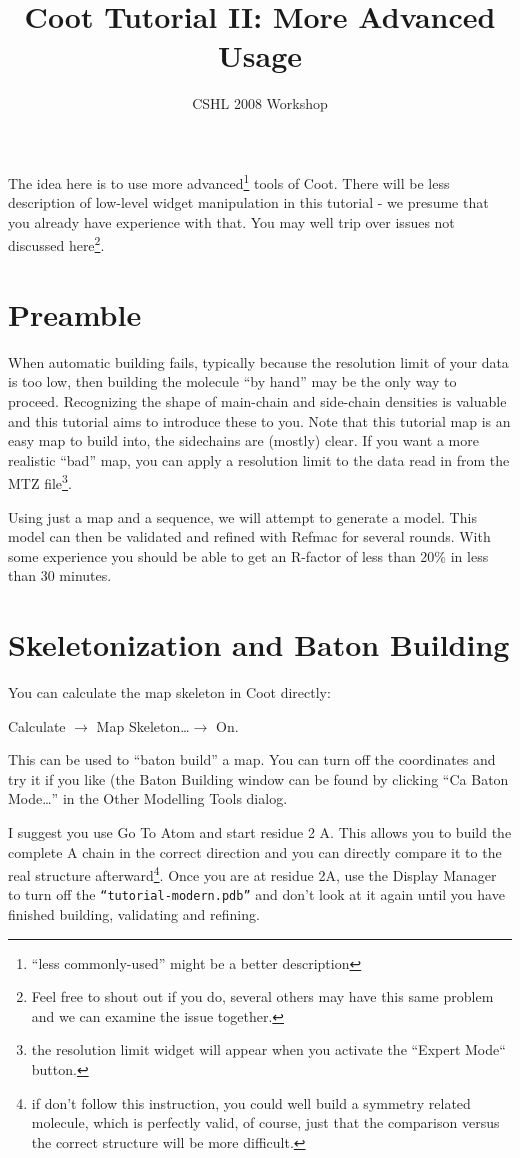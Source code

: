 \documentclass{article}
\title{Coot Tutorial II: More Advanced Usage}
\author{CSHL 2008 Workshop}
\begin{document}
\maketitle

The idea here is to use more advanced\footnote{``less commonly-used''
  might be a better description} tools of Coot.  There will be less
description of low-level widget manipulation in this tutorial - we
presume that you already have experience with that.  You may well trip
over issues not discussed here\footnote{Feel free to shout out if you
  do, several others may have this same problem and we can examine the
  issue together.}.

\section{Preamble}

When automatic building fails, typically because the resolution limit
of your data is too low, then building the molecule ``by hand'' may be
the only way to proceed.  Recognizing the shape of main-chain and
side-chain densities is valuable and this tutorial aims to introduce
these to you.  Note that this tutorial map is an easy map to build
into, the sidechains are (mostly) clear.  If you want a more realistic
``bad'' map, you can apply a resolution limit to the data read in from
the MTZ file\footnote{the resolution limit widget will appear when you
  activate the ``Expert Mode`` button.}.

Using just a map and a sequence, we will attempt to generate a model.
This model can then be validated and refined with Refmac for several
rounds.  With some experience you should be able to get an R-factor of
less than 20\% in less than 30 minutes.

\section{Skeletonization and Baton Building}


You can calculate the map skeleton in Coot directly:

\textsf{Calculate $\rightarrow$ Map Skeleton\ldots $\rightarrow$ On.}

This can be used to ``baton build'' a map.  You can turn off the
coordinates and try it if you like (the Baton Building window can be
found by clicking \textsf{``Ca Baton Mode\ldots''} in the Other
Modelling Tools dialog.
  
I suggest you use Go To Atom and start residue 2 A. This allows you to
build the complete A chain in the correct direction and you can
directly compare it to the real structure afterward\footnote{if don't
  follow this instruction, you could well build a symmetry related
  molecule, which is perfectly valid, of course, just that the
  comparison versus the correct structure will be more difficult.}.
Once you are at residue 2A, use the Display Manager to turn off the
{\small\texttt{``tutorial-modern.pdb''}} and don't look at it again
until you have finished building, validating and refining.
  
\end{document}
